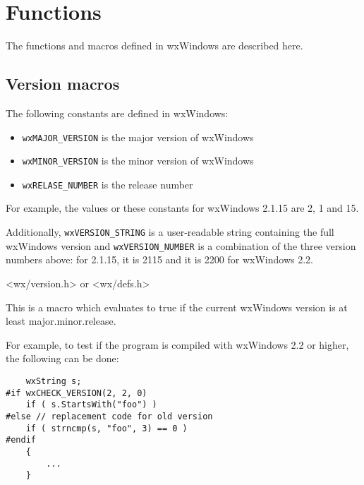 \chapter{Functions}\label{functions}
%
\setfooter{\thepage}{}{}{}{}{\thepage}

The functions and macros defined in wxWindows are described here.

\section{Version macros}\label{versionfunctions}

The following constants are defined in wxWindows:

\begin{itemize}\itemsep=0pt
\item {\tt wxMAJOR\_VERSION} is the major version of wxWindows
\item {\tt wxMINOR\_VERSION} is the minor version of wxWindows
\item {\tt wxRELASE\_NUMBER} is the release number
\end{itemize}

For example, the values or these constants for wxWindows 2.1.15 are 2, 1 and
15.

Additionally, {\tt wxVERSION\_STRING} is a user-readable string containing
the full wxWindows version and {\tt wxVERSION\_NUMBER} is a combination of the
three version numbers above: for 2.1.15, it is 2115 and it is 2200 for
wxWindows 2.2.


<wx/version.h> or <wx/defs.h>

\label{wxcheckversion}


This is a macro which evaluates to true if the current wxWindows version is at
least major.minor.release.

For example, to test if the program is compiled with wxWindows 2.2 or higher,
the following can be done:

\begin{verbatim}
    wxString s;
#if wxCHECK_VERSION(2, 2, 0)
    if ( s.StartsWith("foo") )
#else // replacement code for old version
    if ( strncmp(s, "foo", 3) == 0 )
#endif
    {
        ...
    }
\end{verbatim}

